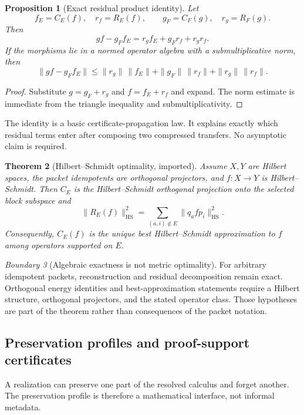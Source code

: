 \documentclass[11pt]{article}
\newtheorem{theorem}{Theorem}[section]
\newtheorem{proposition}[theorem]{Proposition}
\theoremstyle{definition}
\theoremstyle{remark}
\newtheorem{boundary}[theorem]{Boundary}
\begin{document}
\begin{proposition}[Exact residual product identity]
\label{prop:exact-residual-product}
Let
\[
f_E=C_E(f),\quad r_f=R_E(f),
\qquad
g_F=C_F(g),\quad r_g=R_F(g).
\]
Then
\[
\boxed{
gf-g_Ff_E
=
r_gf_E+g_Fr_f+r_gr_f.}
\]
If the morphisms lie in a normed operator algebra with a submultiplicative norm, then
\[
\|gf-g_Ff_E\|
\le
\|r_g\|\,\|f_E\|
+\|g_F\|\,\|r_f\|
+\|r_g\|\,\|r_f\|.
\]
\end{proposition}

\begin{proof}
Substitute \(g=g_F+r_g\) and \(f=f_E+r_f\) and expand.  The norm estimate is immediate from the triangle inequality and submultiplicativity.
\end{proof}

The identity is a basic certificate-propagation law.  It explains exactly which residual terms enter after composing two compressed transfers.  No asymptotic claim is required.

\begin{theorem}[Hilbert--Schmidt optimality, imported]
\label{thm:hs-optimality-expanded}
Assume \(X,Y\) are Hilbert spaces, the packet idempotents are orthogonal projectors, and \(f:X\to Y\) is Hilbert--Schmidt.  Then \(C_E\) is the Hilbert--Schmidt orthogonal projection onto the selected block subspace and
\[
\|R_E(f)\|_{\mathrm{HS}}^2
=
\sum_{(a,i)\notin E}\|q_afp_i\|_{\mathrm{HS}}^2.
\]
Consequently, \(C_E(f)\) is the unique best Hilbert--Schmidt approximation to \(f\) among operators supported on \(E\).
\end{theorem}

\begin{boundary}[Algebraic exactness is not metric optimality]
\label{bnd:algebraic-vs-metric}
For arbitrary idempotent packets, reconstruction and residual decomposition remain exact.  Orthogonal energy identities and best-approximation statements require a Hilbert structure, orthogonal projectors, and the stated operator class.  Those hypotheses are part of the theorem rather than consequences of the packet notation.
\end{boundary}

\subsection{Preservation profiles and proof-support certificates}
\label{subsec:profile-calculus}

A realization can preserve one part of the resolved calculus and forget another.  The preservation profile is therefore a mathematical interface, not informal metadata.
\end{document}
